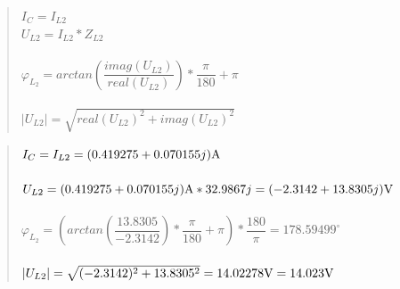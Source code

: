 \begin{quote}
    \centering
	$I_C = I_{L2}$ \\
	$U_{L2} = I_{L2} * Z_{L2}$ \\~\\
	\medskip
	$\varphi_{L_{2}} = arctan(\dfrac{imag(U_{L2})}{real(U_{L2})}) * \dfrac{\pi}{180} + \pi$ \\~\\
	\medskip
	$|U_{L2}| = \sqrt{real(U_{L2})^2 + imag(U_{L2})^2}$
\end{quote}

\newpage
\begin{quote}
    \centering
	$I_C = I_{L2} = (0.419275 + 0.070155j)\Am$ \\~\\
	\medskip
	$U_{L2} = (0.419275 + 0.070155j)\Am * 32.9867j = (-2.3142 + 13.8305j)\Vo$ \\~\\
	\medskip
	$\varphi_{L_{2}} = (arctan(\dfrac{13.8305}{-2.3142}) * \dfrac{\pi}{180} + \pi) * \dfrac{180}{\pi} = 178.59499^\circ$ \\~\\
	\medskip
	$|U_{L2}| = \sqrt{(-2.3142)^2 + 13.8305^2} = 14.02278\Vo = 14.023\Vo$
\end{quote}

